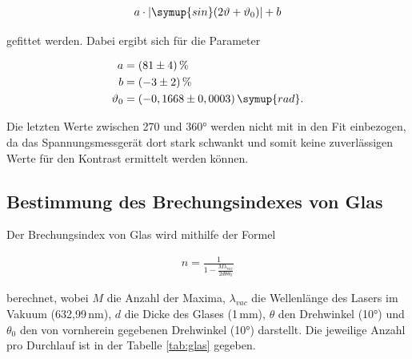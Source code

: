             \begin{align*}
                a \cdot \lvert \symup{sin} (2\vartheta+\vartheta_0)\rvert + b
            \end{align*}

            gefittet werden. Dabei ergibt sich für die Parameter

            \begin{align*}
                a &= (81\pm 4)\,\% \\
                b &= (-3\pm 2)\,\% \\ 
                \vartheta_0 &= (-0,1668\pm 0,0003)\,\symup{rad}.
            \end{align*}

            Die letzten Werte zwischen 270 und 360° werden nicht mit in den Fit einbezogen,
            da das Spannungsmessgerät dort stark schwankt und somit keine zuverlässigen 
            Werte für den Kontrast ermittelt werden können.


        \subsection{Bestimmung des Brechungsindexes von Glas}

            Der Brechungsindex von Glas wird mithilfe der Formel 

            \begin{align*}
                n = \frac{1}{1-\frac{M\lambda_{vac}}{2d\theta\theta_0}}
            \end{align*}

            berechnet, wobei $M$ die Anzahl der Maxima, $\lambda_{vac}$ die Wellenlänge des 
            Lasers im Vakuum (632,99\,nm), $d$ die Dicke des Glases (1\,mm), $\theta$ den Drehwinkel (10°)
            und $\theta_0$ den von vornherein gegebenen Drehwinkel (10°) darstellt.
            Die jeweilige Anzahl pro Durchlauf ist in der Tabelle \ref{tab:glas} gegeben. 
            
